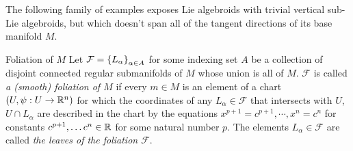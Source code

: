 


The following family of examples exposes Lie algebroids with trivial vertical sub-Lie algebroids, but which doesn't span all of the tangent directions of its base manifold $M$.

\begin{definition} {Foliation of $M$}
Let $\mathcal F = \left\{ L_\alpha \right\}_{\alpha \in A}$ for some indexing set $A$ be a collection of disjoint connected regular submanifolds of $M$ whose union is all of $M$. $\mathcal F$ is called \emph{a %
(smooth) foliation of $M$} if every $m \in M$ is an element of a chart  $(U, \psi:U \to \mathbb{R}^n)$ for which the coordinates of any $L_\alpha \in \mathcal F$ that intersects with $U$, $U \cap L_\alpha$ are described in the chart by the equations $x^{p+1} = c^{p+1}, \cdots , x^{n} = c^{n} $ for constants $c^{p+1}, \dots c^n \in \mathbb{R}$ for some natural number $p$. The elements $L_\alpha \in \mathcal F$ are called \emph{the leaves of the foliation $\mathcal F$}.
\end{definition}

